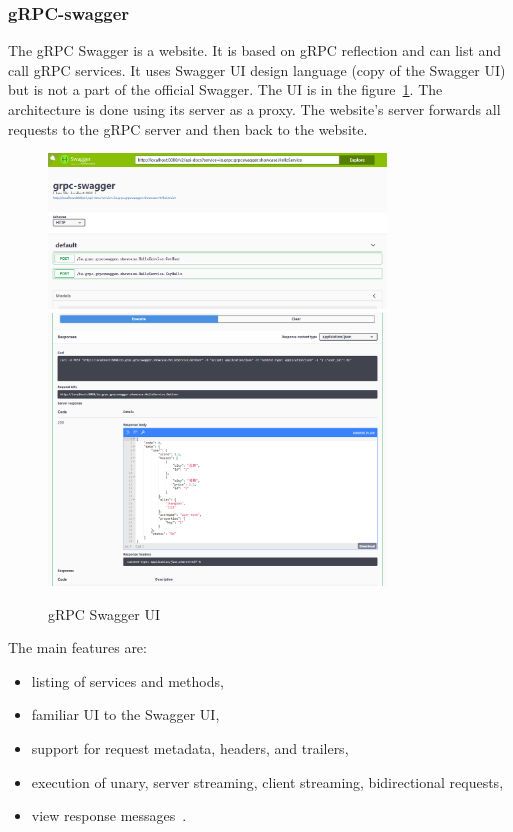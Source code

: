 \subsubsection{gRPC-swagger}
The gRPC Swagger is a website.
It is based on gRPC reflection and can list and call gRPC services.
It uses Swagger UI design language (copy of the Swagger UI) but is not a part of the official Swagger.
The UI is in the figure~\ref{fig:grpc-swagger}.
The architecture is done using its server as a proxy.
The website's server forwards all requests to the gRPC server and then back to the website.
\cite{grpc-letmegrpc}

\begin{figure}[hbt!]
    \centering
    \captionsetup{justification=centering}
    \includegraphics[width=0.8\textwidth]{images/grpc/swagger-1}
    \includegraphics[width=0.8\textwidth]{images/grpc/swagger-2}
    \caption{gRPC Swagger UI~\cite{grpc-swagger}}
    \label{fig:grpc-swagger}
\end{figure}

The main features are:
\begin{itemize}
    \item listing of services and methods,
    \item familiar UI to the Swagger UI,
    \item support for request metadata, headers, and trailers,
    \item execution of unary, server streaming, client streaming, bidirectional requests,
    \item view response messages~\cite{grpc-swagger}.
\end{itemize}


